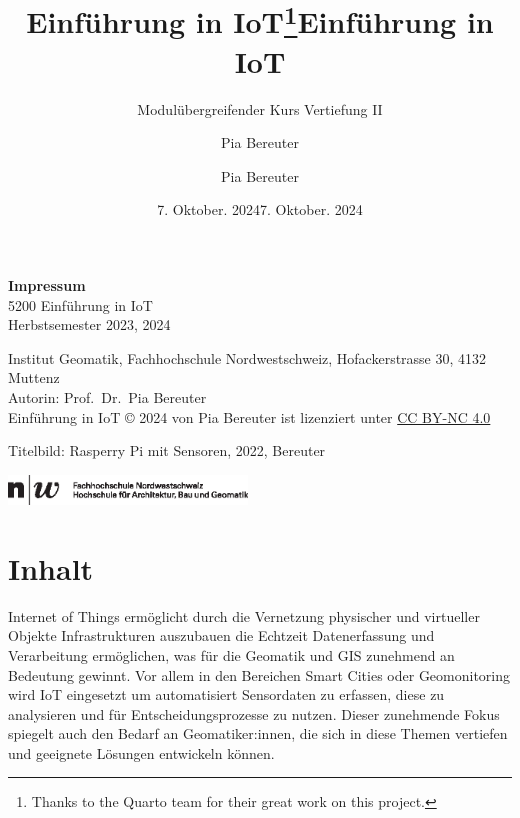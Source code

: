 \documentclass[
  11pt,
  a4paperpaper,
  oneside, openany  ,captions=tableheading
]{scrbook}
\title{Einführung in IoT\thanks{Thanks to the Quarto team for their
great work on this project.}}
\subtitle{Modulübergreifender Kurs Vertiefung II}
\author{Pia Bereuter}
\date{7. Oktober. 2024}
\title{Einführung in IoT}
\author{Pia Bereuter}
\date{7. Oktober. 2024}
\renewcommand*\contentsname{Inhaltsverzeichnis}
\newcommand\contentsname{Inhaltsverzeichnis}
\theoremstyle{definition}
\theoremstyle{remark}
\begin{document}
\clearpage
\thispagestyle{empty}
\makeatletter%
\makeatother%
\clearpage
\thispagestyle{empty}
\vspace*{\fill}
{\footnotesize 
\textbf{Impressum} \\
5200 Einführung in IoT\\
Herbstsemester 2023, 2024

Institut Geomatik, Fachhochschule Nordwestschweiz, Hofackerstrasse 30,
4132 Muttenz\\
Autorin: Prof.~Dr.~Pia Bereuter\\
Einführung in IoT © 2024 von Pia Bereuter ist lizenziert unter
\href{https://creativecommons.org/licenses/by-nc/4.0/}{CC BY-NC 4.0}

Titelbild: Rasperry Pi mit Sensoren, 2022, Bereuter

\includegraphics[height=8mm]{images/fhnw.eps}}
\clearpage

\frontmatter


\renewcommand*\contentsname{Inhaltsverzeichnis}
{
\hypersetup{linkcolor=}
\setcounter{tocdepth}{1}
\tableofcontents
}

%		


\mainmatter
{}

\chapter*{Inhalt}\label{inhalt}


Internet of Things ermöglicht durch die Vernetzung physischer und
virtueller Objekte Infrastrukturen auszubauen die Echtzeit
Datenerfassung und Verarbeitung ermöglichen, was für die Geomatik und
GIS zunehmend an Bedeutung gewinnt. Vor allem in den Bereichen Smart
Cities oder Geomonitoring wird IoT eingesetzt um automatisiert
Sensordaten zu erfassen, diese zu analysieren und für
Entscheidungsprozesse zu nutzen. Dieser zunehmende Fokus spiegelt auch
den Bedarf an Geomatiker:innen, die sich in diese Themen vertiefen und
geeignete Lösungen entwickeln können.
\end{document}
